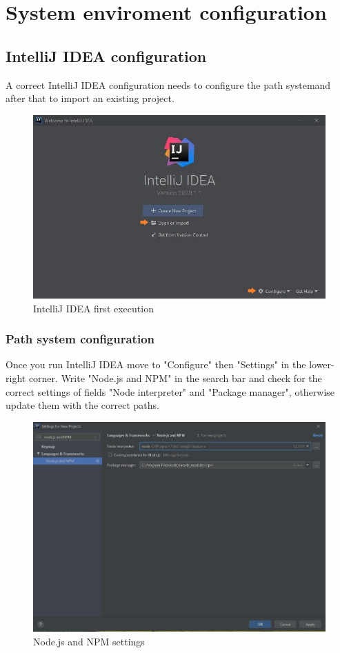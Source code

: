\section{System enviroment configuration}
	\subsection{IntelliJ IDEA configuration}
A correct IntelliJ IDEA configuration needs to configure the path system\glo and after that to import an existing project.
	
	\begin{figure}[H]
		\centering
		\includegraphics[scale=0.70]{../Developer_manual/img/intellijidea_main.jpg}
		\caption{IntelliJ IDEA first execution}
	\end{figure}	

	

	\subsubsection{Path system configuration}
Once you run IntelliJ IDEA move to "Configure" then "Settings" in the lower-right corner. Write "Node.js and NPM" in the search bar and check for the correct settings of fields "Node interpreter" and "Package manager", otherwise update them with the correct paths. 

\begin{figure}[H]
		\centering
		\includegraphics[scale=0.60]{../Developer_manual/img/nodejs_and_npm.jpg}
		\caption{Node.js and NPM settings}
	\end{figure}	

